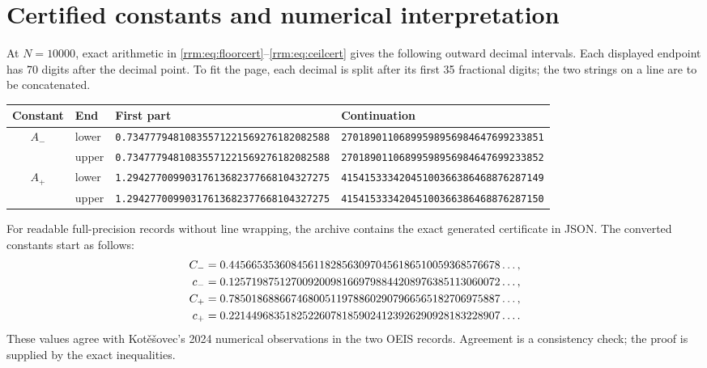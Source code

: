 \documentclass[11pt]{article}
\theoremstyle{remark}\newtheorem{remark}[theorem]{Remark}
\begin{document}
\section{Certified constants and numerical interpretation}\label{rrm:sec:numerics}
At $N=10000$, exact arithmetic in \eqref{rrm:eq:floorcert}--\eqref{rrm:eq:ceilcert} gives the following outward decimal intervals. Each displayed endpoint has 70 digits after the decimal point. To fit the page, each decimal is split after its first 35 fractional digits; the two strings on a line are to be concatenated.

\begin{center}\small
\setlength{\tabcolsep}{3pt}
\begin{tabular}{clll}
\toprule
Constant&End&First part&Continuation\\\midrule
$A_-$&lower&\texttt{0.73477794810835571221569276182082588}&\texttt{27018901106899598956984647699233851}\\
&upper&\texttt{0.73477794810835571221569276182082588}&\texttt{27018901106899598956984647699233852}\\[3pt]
$A_+$&lower&\texttt{1.29427700990317613682377668104327275}&\texttt{41541533342045100366386468876287149}\\
&upper&\texttt{1.29427700990317613682377668104327275}&\texttt{41541533342045100366386468876287150}\\\bottomrule
\end{tabular}
\end{center}

For readable full-precision records without line wrapping, the archive contains the exact generated certificate in JSON. The converted constants start as follows:
\begin{align}
 C_-&=0.445665353608456118285630970456186510059368576678\ldots,\notag\\
 c_-&=0.125719875127009200981669798844208976385113060072\ldots,\label{rrm:eq:decimalminus}\\
 C_+&=0.785018688667468005119788602907966565182706975887\ldots,\notag\\
 c_+&=0.221449683518252260781859024123926290928183228907\ldots.\label{rrm:eq:decimalplus}
\end{align}
These values agree with Kot\v e\v sovec's 2024 numerical observations in the two OEIS records. Agreement is a consistency check; the proof is supplied by the exact inequalities.
\end{document}
